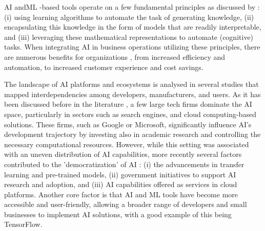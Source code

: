 \documentclass[CHICAGO,Times1COL]{WileyNJDv5} %
\begin{document}
\ac{AI} and\ac{ML} -based tools operate on a few fundamental principles as discussed by \citet{nguyen2022artificial}: (i) using learning algorithms to automate the task of generating knowledge, (ii) encapsulating this knowledge in the form of models that are readily interpretable, and (iii) leveraging these mathematical representations to automate (cognitive) tasks. When integrating \ac{AI} in business operations utilizing these principles, there are numerous benefits for organizations \citep{enholm2022artificial}, from increased efficiency and automation, to increased customer experience and cost savings. 

The landscape of \ac{AI} platforms and ecosystems is analysed in several studies \citep{jacobides2021evolutionary, burstrom2021ai} that mapped interdependencies among developers, manufacturers, and users. As it has been discussed before in the literature \citep{jacobides2021evolutionary}, a few large tech firms dominate the \ac{AI} space, particularly in sectors such as search engines, and cloud computing-based solutions. These firms, such as Google or Microsoft, significantly influence AI's development trajectory by investing also in academic research and controlling the necessary computational resources. However, while this setting was associated with an uneven distribution of \ac{AI} capabilities, more recently several factors  contributed to the 'democratization' of \ac{AI} \citep{sundberg2023democratizing}: (i) the advancements in transfer learning and pre-trained models, (ii) government initiatives to support \ac{AI} research and adoption, and (iii) \ac{AI} capabilities offered as services in cloud platforms. Another core factor is  that \ac{AI} and \ac{ML} tools have become more accessible and user-friendly, allowing a broader range of developers and small businesses to implement \ac{AI} solutions, with a good example of this being TensorFlow. 
\end{document}
